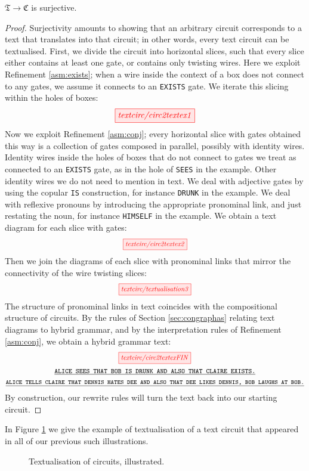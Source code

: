 \begin{proposition}\label{lem:surj}
$\mathfrak{T} \rightarrow \mathfrak{C}$ is surjective.
\begin{proof}
Surjectivity amounts to showing that an arbitrary circuit corresponds to a text that translates into that circuit; in other words, every text circuit can be textualised. First, we divide the circuit into horizontal slices, such that every slice either contains at least one gate, or contains only twisting wires. Here we exploit Refinement \ref{asm:exists}; when a wire inside the context of a box does not connect to any gates, we assume it connects to an  \texttt{EXISTS} gate. We iterate this slicing within the holes of boxes:  
\[
\tikzfig{textcirc/circ2textex1} 
\]
Now we exploit Refinement \ref{asm:conj}; every horizontal slice with gates obtained this way is a collection of gates composed in parallel, possibly with identity wires. Identity wires inside the holes of boxes that do not connect to gates we treat as connected to an \texttt{EXISTS} gate, as in the hole of \texttt{SEES} in the example. Other identity wires we do not need to mention in text.  We deal with adjective gates by using the copular \texttt{IS} construction, for instance \texttt{DRUNK} in the example. We deal with reflexive pronouns by introducing the appropriate pronominal link, and just restating the noun, for instance \texttt{HIMSELF} in the example.  We obtain a text diagram for each slice with gates:
\[
\scalebox{0.8}{\tikzfig{textcirc/circ2textex2}}
\]
Then we join the diagrams of each slice with pronominal links that mirror the connectivity of the wire twisting slices:
\[
\scalebox{0.8}{\tikzfig{textcirc/textualisation3}}
\]
The structure of pronominal links in text coincides with the compositional structure of circuits. By the rules of Section \ref{sec:congraphas} relating text diagrams to hybrid grammar, and by the interpretation rules of Refinement \ref{asm:conj}, we obtain a hybrid grammar text:
\[
\scalebox{0.8}{\tikzfig{textcirc/circ2textexFIN}}
\]
\[
\footnotesize{
\texttt{\underline{ALICE SEES THAT BOB IS DRUNK AND ALSO THAT CLAIRE EXISTS.}}
}\]
\[
\footnotesize{
\texttt{\underline{ALICE TELLS CLAIRE THAT DENNIS HATES DEE AND ALSO THAT DEE LIKES DENNIS, BOB LAUGHS AT BOB.}}
}\]
By construction, our rewrite rules will turn the text back into our starting circuit.
\end{proof}
\end{proposition}

\begin{example}
In Figure \ref{fig:comic3} we give the example of textualisation of a text circuit that appeared in all of our previous such illustrations.

\begin{figure}[h!]
    \centering
    \caption{Textualisation of circuits, illustrated.}
    \label{fig:comic3}
\end{figure}
\end{example}

